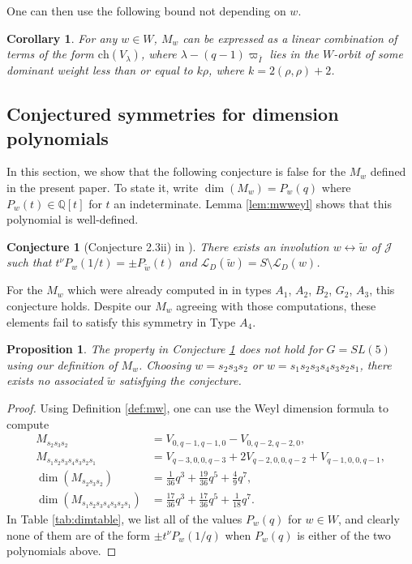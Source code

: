 \documentclass{amsart}
\newtheorem{corollary}[thm]{Corollary}
\newtheorem{prop}[thm]{Proposition}
\newtheorem{conjecture}[thm]{Conjecture}
\theoremstyle{definition}
\begin{document}
One can then use the following bound not depending on $w$.
\begin{corollary}\label{cor:finalbound}
    For any $w \in W$, $M_w$ can be expressed as a linear combination of terms of the form $\mathrm{ch}(V_\lambda)$, where $\lambda - (q - 1)\varpi_{\overline{I}}$ lies in the $W$-orbit of some dominant weight less than or equal to $k\rho$, where $k = 2(\rho, \rho) + 2$.
\end{corollary}


\subsection{Conjectured symmetries for dimension polynomials}\label{sec:symmetry}


In this section, we show that the following conjecture is false for the $M_w$ defined in the present paper. To state it, write $\dim(M_w) = P_w(q)$ where $P_w(t) \in \mathbb{Q}[t]$ for $t$ an indeterminate. Lemma \ref{lem:mwweyl} shows that this polynomial is well-defined.
\begin{conjecture}[Conjecture 2.3ii) in \cite{L}]\label{conj:symmetry}
    There exists an involution $w \leftrightarrow \tilde{w}$ of $\mathcal{J}$ such that $t^\nu P_w(1/t) = \pm P_{\tilde{w}}(t)$ and $\mathcal{L}_D(\tilde{w}) = S\setminus \mathcal{L}_D(w)$.
\end{conjecture}

For the $M_w$ which were already computed in \cite{L} in types $A_1$, $A_2$, $B_2$, $G_2$, $A_3$, this conjecture holds. Despite our $M_w$ agreeing with those computations, these elements fail to satisfy this symmetry in Type $A_4$.
\begin{prop}\label{prop:nosymmetry}
    The property in Conjecture \ref{conj:symmetry} does not hold for $G = SL(5)$ using our definition of $M_w$. Choosing $w = s_2s_3s_2$ or $w = s_1s_2s_3s_4s_3s_2s_1$, there exists no associated $\tilde{w}$ satisfying the conjecture.
\end{prop}
\begin{proof}
    Using Definition \ref{def:mw}, one can use the Weyl dimension formula to compute
    \begin{align*}
        M_{s_2s_3s_2} & = V_{0,q-1,q-1,0} - V_{0,q-2,q-2,0},\\
        M_{s_1s_2s_3s_4s_3s_2s_1} & = V_{q-3,0,0,q-3} + 2V_{q-2,0,0,q-2} + V_{q-1,0,0,q-1},\\
        \dim(M_{s_2s_3s_2}) & = \frac{1}{36}q^3 + \frac{19}{36}q^5 + \frac{4}{9}q^7,\\
        \dim(M_{s_1s_2s_3s_4s_3s_2s_1}) & = \frac{17}{36}q^3 + \frac{17}{36}q^5 + \frac{1}{18}q^7.
    \end{align*}
    In Table \ref{tab:dimtable}, we list all of the values $P_w(q)$ for $w \in W$, and clearly none of them are of the form $\pm t^\nu P_w(1/q)$ when $P_w(q)$ is either of the two polynomials above.
\end{proof}
\end{document}
